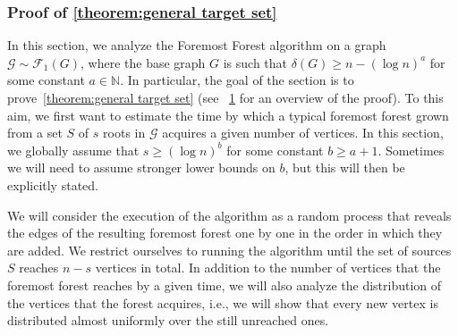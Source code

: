 \documentclass[a4paper,11pt]{article}
\theoremstyle{definition}
\theoremstyle{plain}
\newcommand{\NN}{\ensuremath{\mathbb{N}}}
\newcommand{\FFF}{\mathcal{F}}
\newcommand{\GGG}{\mathcal{G}}
\begin{document}
\begin{figure}[omitted: a diagram of this paper's results, not reproduced here]\label{fig:reading_guide}\end{figure}



\subsubsection{Proof of \cref{theorem:general target set}}
\label{sec: foremost forest analysis}
In this section, we analyze the Foremost Forest algorithm on a graph $\GGG\sim\FFF_1(G)$, where the base graph $G$ is such that $\delta(G)\ge n-(\log n)^a$ for some constant $a\in \NN$. In particular, the goal of the section is to prove~\cref{theorem:general target set} (see ~\cref{fig:reading_guide} for an overview of the proof). 
To this aim, we first want to estimate the time by which a typical foremost forest grown from a set $S$ of $s$ roots in $\GGG$ acquires a given number of vertices.
In this section, we globally assume that $s\ge (\log n)^b$ for some constant $b\ge a + 1$.
Sometimes we will need to assume stronger lower bounds on $b$, but this will then be explicitly stated.

We will consider the execution of the algorithm as a random process that reveals the edges of the resulting foremost forest one by one in the order in which they are added.
We restrict ourselves to running the algorithm until the set of sources $S$ reaches $n-s$ vertices in total.
In addition to the number of vertices that the foremost forest reaches by a given time, we will also analyze the distribution of the vertices that the forest acquires, i.e., we will show that every new vertex is distributed almost uniformly over the still unreached ones.
\end{document}
